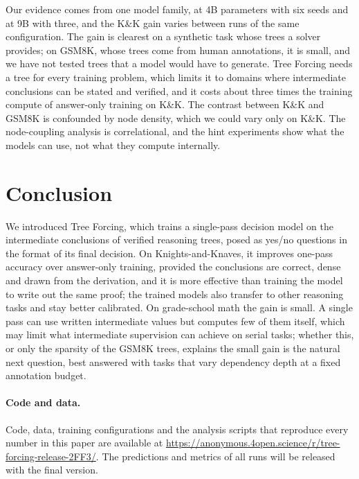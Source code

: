\documentclass[10pt]{article}
\newcommand{\tf}{Tree Forcing}
\begin{document}
Our evidence comes from one model family, at 4B parameters with six seeds and at 9B with three, and the K\&K gain
varies between runs of the same configuration. The gain is clearest on a synthetic task whose trees a solver provides;
on GSM8K, whose trees come from human annotations, it is small, and we have not tested trees that a model would have
to generate. \tf{} needs a tree for every training problem, which limits it to domains where intermediate conclusions
can be stated and verified, and it costs about three times the training compute of answer-only training on K\&K. The
contrast between K\&K and GSM8K is confounded by node density, which we could vary only on K\&K. The node-coupling
analysis is correlational, and the hint experiments show what the models can use, not what they compute internally.

\section{Conclusion}
\label{sec:conclusion}

We introduced \tf{}, which trains a single-pass decision model on the intermediate conclusions of verified reasoning
trees, posed as yes/no questions in the format of its final decision. On Knights-and-Knaves, it improves one-pass
accuracy over answer-only training, provided the conclusions are correct, dense and drawn from the derivation, and it
is more effective than training the model to write out the same proof; the trained models also transfer to other
reasoning tasks and stay better calibrated. On grade-school math the gain is small. A single pass can use written
intermediate values but computes few of them itself, which may limit what intermediate supervision can achieve on
serial tasks; whether this, or only the sparsity of the GSM8K trees, explains the small gain is the natural next
question, best answered with tasks that vary dependency depth at a fixed annotation budget.


\paragraph{Code and data.} Code, data, training configurations and the analysis scripts that reproduce every
number in this paper are available at \url{https://anonymous.4open.science/r/tree-forcing-release-2FF3/}. The predictions and metrics of all runs will be released with
the final version.
\end{document}
